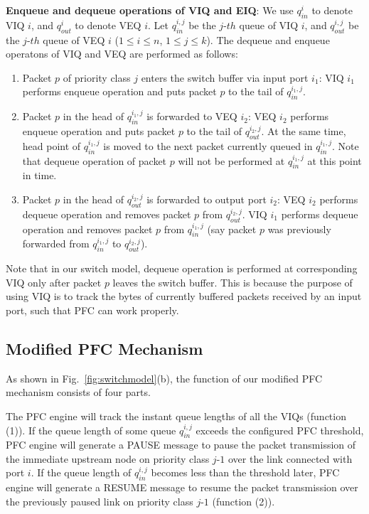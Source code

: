 \textbf{Enqueue and dequeue operations of VIQ and EIQ}: We use $q_{in}^{i}$ to denote VIQ $i$, and $q_{out}^{i}$ to denote VEQ $i$.
Let $q_{in}^{i,j}$ be the $j$-$th$ queue of VIQ $i$, and $q_{out}^{i,j}$ be the $j$-$th$ queue of VEQ $i$ ($1\leq i \leq n$, $1 \leq j \leq k$). The dequeue and enqueue operatons of VIQ and VEQ are performed as follows:
	
	\begin{enumerate}
		\item  Packet $p$ of priority class $j$ enters the switch buffer via input port $i_1$: VIQ $i_1$ performs enqueue operation and puts packet $p$ to the tail of $q_{in}^{i_1,j}$.
		
		\item  Packet $p$ in the head of $q_{in}^{i_1,j}$ is forwarded to VEQ $i_2$:  VEQ $i_2$ performs enqueue operation and puts packet $p$ to the tail of $q_{out}^{i_2,j}$. At the same time, head point of $q_{in}^{i_1,j}$ is moved to the next packet currently queued in $q_{in}^{i_1,j}$. Note that dequeue operation of packet $p$ will not be performed at $q_{in}^{i_1,j}$ at this point in time. 
		
		\item  Packet $p$ in the head of $q_{out}^{i_2,j}$ is forwarded to output port $i_2$: VEQ $i_2$ performs dequeue operation and removes packet $p$ from $q_{out}^{i_2,j}$.  VIQ $i_1$ performs dequeue operation and removes packet $p$ from $q_{in}^{i_1,j}$ (say packet $p$ was previously forwarded from $q_{in}^{i_1,j}$ to $q_{out}^{i_2,j}$). 
	\end{enumerate}
		
	Note that in our switch model, dequeue operation is performed at corresponding VIQ only after packet $p$ leaves the switch buffer. This is because the purpose of using VIQ is to track the bytes of currently buffered packets received by an input port, such that PFC can work properly.

\subsection{Modified PFC Mechanism}\label{subsec:PFC}

As shown in Fig.~\ref{fig:switchmodel}(b), the function of our modified PFC mechanism consists of four parts. 

The PFC engine will track the instant queue lengths of all the VIQs (function (1)). If the queue length of some queue  $q_{in}^{i,j}$ exceeds the configured PFC threshold, PFC engine will generate a PAUSE message to pause the packet transmission of the immediate upstream node on priority class $j$-$1$ over the link connected with port $i$. If the queue length of $q_{in}^{i,j}$ becomes less than the threshold later, PFC engine will generate a RESUME message to resume the packet transmission over the previously paused link on priority class $j$-$1$ (function (2)).

